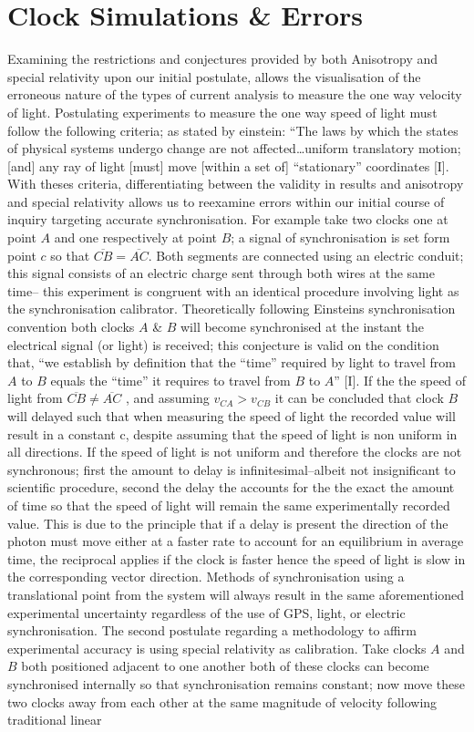 \documentclass[12pt,letterpaper]{article}
\begin{document}
\section{Clock Simulations \& Errors}
Examining the restrictions and conjectures provided by both Anisotropy and special relativity upon our initial postulate, allows the visualisation of the erroneous nature of the types of current analysis to measure the one way velocity of light. Postulating experiments to measure the one way speed of light must follow the following criteria; as stated by einstein: “The laws by which the states of physical systems undergo change are not affected…uniform translatory motion; [and]  any ray of light [must] move [within a set of] “stationary” coordinates [I]. With theses criteria, differentiating between the validity in results and anisotropy and special relativity allows us to reexamine errors within our initial course of inquiry targeting accurate synchronisation. For example take two clocks one at point $A$ and one respectively at point $B$; a signal of synchronisation is set form point $c$ so that $\overline {CB}= \overline {AC}$. Both segments are connected using an electric conduit; this signal consists of an electric charge sent through both wires at the same time– this experiment is congruent with an identical procedure involving light as the synchronisation calibrator. Theoretically following Einsteins synchronisation convention both clocks $A$ & $B$ will become synchronised at the instant the electrical signal (or light) is received; this conjecture is valid on the condition that, “we establish by definition that the “time” required by light to travel from $A$ to $B$ equals the “time” it requires to travel from $B$ to $A$” [I]. If the the speed of light from $\overline {CB} \neq \overline {AC}$ , and assuming $v_{CA}>v_{CB}$ it can be concluded that clock $B$ will delayed such that when measuring the speed of light the recorded value will result in a constant c, despite assuming that the speed of light is non uniform in all directions. If the speed of light is not uniform and therefore the clocks are not synchronous; first the amount to delay is infinitesimal–albeit not insignificant to scientific procedure, second the delay the accounts for the the exact the amount of time so that the speed of light will remain the same experimentally recorded value. This is due to the principle that if a delay is present the direction of the photon must move either at a faster rate to account for an equilibrium in average time, the reciprocal applies if the clock is faster hence the speed of light is slow in the corresponding vector direction. Methods of synchronisation using a translational point from the system will always result in the same aforementioned experimental uncertainty regardless of the use of GPS, light, or electric synchronisation. The second postulate regarding a methodology to affirm experimental accuracy is using special relativity as calibration. Take clocks $A$ and $B$ both positioned adjacent to one another both of these clocks can become synchronised internally so that synchronisation remains constant; now move these two clocks away from each other at the same magnitude of velocity following traditional linear 
\end{document}
